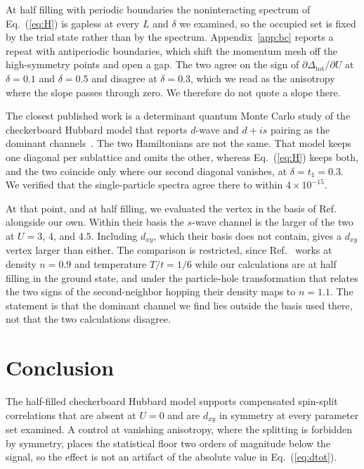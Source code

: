 \documentclass[aps,prb,reprint,superscriptaddress,amsmath,amssymb,floatfix]{revtex4-2}
\begin{document}
At half filling with periodic boundaries the noninteracting spectrum of
Eq.~(\ref{eq:H}) is gapless at every $L$ and $\delta$ we examined, so the
occupied set is fixed by the trial state rather than by the spectrum.
Appendix~\ref{app:bc} reports a repeat with antiperiodic boundaries, which shift
the momentum mesh off the high-symmetry points and open a gap. The two agree on
the sign of $\partial \Delta_{\mathrm{tot}} / \partial U$ at $\delta = 0.1$ and
$\delta = 0.5$ and disagree at $\delta = 0.3$, which we read as the anisotropy
where the slope passes through zero. We therefore do not quote a slope there.

The closest published work is a determinant quantum Monte Carlo study of the
checkerboard Hubbard model that reports $d$-wave and $d + is$ pairing as the
dominant channels~\cite{Pan2024}. The two Hamiltonians are not the same. That
model keeps one diagonal per sublattice and omits the other, whereas
Eq.~(\ref{eq:H}) keeps both, and the two coincide only where our second diagonal
vanishes, at $\delta = t_1 = 0.3$. We verified that the single-particle spectra
agree there to within $4\times10^{-15}$.

At that point, and at half filling, we evaluated the vertex in the basis of
Ref.~\cite{Pan2024} alongside our own. Within their basis the $s$-wave channel is
the larger of the two at $U = 3$, $4$, and $4.5$. Including $d_{xy}$, which their
basis does not contain, gives a $d_{xy}$ vertex larger than either.
The comparison is restricted, since Ref.~\cite{Pan2024} works at density
$n = 0.9$ and temperature $T/t = 1/6$ while our calculations are at half filling
in the ground state, and under the particle-hole transformation that relates the
two signs of the second-neighbor hopping their density maps to $n = 1.1$. The
statement is that the dominant channel we find lies outside the basis used there,
not that the two calculations disagree.

\section{Conclusion}

The half-filled checkerboard Hubbard model supports compensated spin-split
correlations that are absent at $U = 0$ and are $d_{xy}$ in symmetry at every
parameter set examined. A control at vanishing anisotropy, where the splitting is
forbidden by symmetry, places the statistical floor two orders of magnitude below
the signal, so the effect is not an artifact of the absolute value in
Eq.~(\ref{eq:dtot}).
\end{document}
